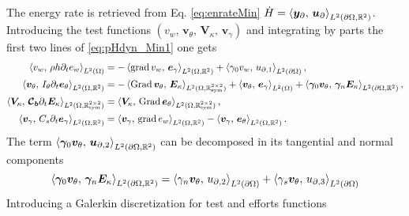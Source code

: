 The energy rate is retrieved from Eq. \eqref{eq:enrateMin} $\dot{H} = \inner[L^2(\partial\Omega, \mathbb{R}^2)]{\bm{y}_\partial}{\bm{u}_\partial}$. Introducing the test functions $(v_w,\, \bm{v}_\theta, \, \bm{V}_\kappa, \, \bm{v}_\gamma)$ and integrating by parts the first two lines of \eqref{eq:pHdyn_Min1} one gets 
\begin{equation}\label{eq:weak_min_grad}
\begin{aligned}
\inner[L^2(\Omega)]{v_w}{\rho h \partial_t e_w} &= -\inner[L^2(\Omega, \mathbb{R}^{2})]{\grad v_w}{\bm{e}_\gamma} + \inner[L^2(\partial\Omega)]{\gamma_0 v_w}{{u}_{\partial, 1}}, \\
\inner[L^2(\Omega, \mathbb{R}^{2})]{\bm{v}_\theta}{I_\theta \partial_t \bm{e}_\theta} &= -\inner[L^2(\Omega, \mathbb{R}^{2\times 2}_{\text{sym}})]{\Grad \bm{v}_\theta}{\bm{E}_\kappa} + \inner[L^2(\Omega)]{\bm{v}_\theta}{\bm{e}_\gamma} + \inner[L^2(\partial\Omega, \mathbb{R}^2)]{\bm\gamma_0 \bm{v}_\theta}{\bm\gamma_n \bm{E}_{\kappa}}, \\
\inner[L^2(\Omega, \mathbb{R}^{2\times 2}_{\text{sym}})]{\bm{V}_\kappa}{\bm{\mathcal{C}_b} \partial_t \bm{E}_\kappa} &= \inner[L^2(\Omega, \mathbb{R}^{2\times 2}_{\text{sym}})]{\bm{V}_\kappa}{\Grad \bm{e}_\theta}, \\
\inner[L^2(\Omega, \mathbb{R}^{2})]{\bm{v}_\gamma}{C_s \partial_t \bm{e}_\gamma} &= \inner[L^2(\Omega, \mathbb{R}^{2})]{\bm{v}_\gamma}{\grad e_w} - \inner[L^2(\Omega, \mathbb{R}^{2})]{\bm{v}_\gamma}{\bm{e}_\theta}. \\
\end{aligned}
\end{equation}
The term $\inner[L^2(\partial\Omega, \mathbb{R}^2)]{\bm\gamma_0 \bm{v}_\theta}{\bm{u}_{\partial,2}}$ can be decomposed in its tangential and normal components
\begin{equation}
	\inner[L^2(\partial\Omega, \mathbb{R}^2)]{\bm\gamma_0 \bm{v}_\theta}{\bm\gamma_n \bm{E}_{\kappa}} = \inner[L^2(\partial\Omega)]{\gamma_n \bm{v}_\theta}{{u}_{\partial,2}} + \inner[L^2(\partial\Omega)]{\gamma_s \bm{v}_\theta}{{u}_{\partial,3}}
\end{equation}
Introducing a Galerkin discretization for test and efforts functions
